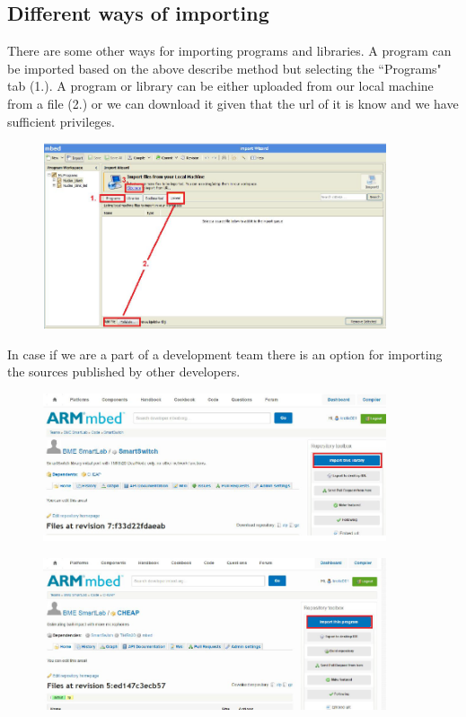 \documentclass[a4paper]{article}
\begin{document}
\subsection{Different ways of importing}

There are some other ways for importing programs and libraries. A program can be imported based on the above describe
method but selecting the ``Programs" tab (1.).
A program or library can be either uploaded from our local machine from a file (2.) or we can download it given that
the url of it is know and we have sufficient privileges.

\begin{figure}[H]
    \centering
    \includegraphics[width=0.9\textwidth]{figures/mbed-import2.png}
\end{figure}

In case if we are a part of a development team there is an option for importing the sources published by other
developers.

\begin{figure}[H]
    \centering
    \includegraphics[width=0.9\textwidth]{figures/mbed-online-import.png}
\end{figure}
\begin{figure}[H]
    \centering
    \includegraphics[width=0.9\textwidth]{figures/mbed-online-import2.png}
\end{figure}
\end{document}
